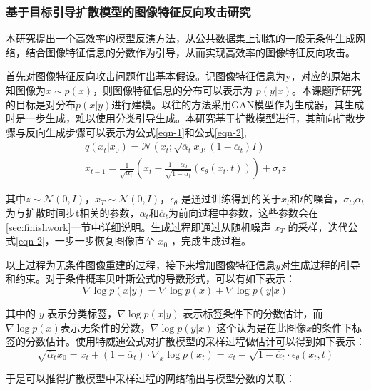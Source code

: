 \subsubsection{基于目标引导扩散模型的图像特征反向攻击研究}\label{sec:plan_1}
本研究提出一个高效率的模型反演方法，从公共数据集上训练的一般无条件生成网络，结合图像特征信息的分数作为引导，从而实现高效率的图像特征反向攻击。
\par
首先对图像特征反向攻击问题作出基本假设。记图像特征信息为y，对应的原始未知图像为$x \sim p(x)$，则图像特征信息的分布可以表示为 $p(y|x)$。本课题所研究的目标是对分布$p(x|y)$进行建模。以往的方法采用GAN模型作为生成器，其生成时是一步生成，难以使用分类引导生成。本研究基于扩散模型进行，其前向扩散步骤与反向生成步骤可以表示为公式\eqref{eqn-1}和公式\eqref{eqn-2},
\begin{align}
      q(x_t|x_{0})=\mathcal{N}(x_t;\sqrt{\overline{\alpha}_t}x_{0},(1-\overline{\alpha}_t)I)\label{eqn-1} \\
      x_{t-1}= \frac{1}{\sqrt{\alpha_t}}
      (x_t -
      \frac{1-\alpha_T}{\sqrt{1-\overline{\alpha}_t}}
      (\epsilon_\theta(x_t,t))) + \sigma_t z \label{eqn-2}
\end{align}
\par
其中$z \sim \mathcal{N}(0,I)$，$x_T \sim \mathcal{N}(0,I)$，$\epsilon_\theta$ 是通过训练得到的关于$x_t$和$t$的噪音，$\sigma_t$,$\alpha_t$ 为与扩散时间步t相关的参数，$\alpha_t$和$\overline{\alpha}_t$为前向过程中参数，这些参数会在\ref{sec:finishwork}一节中详细说明。生成过程即通过从随机噪声 $x_T$ 的采样，迭代公式\eqref{eqn-2}，一步一步恢复图像直至 $x_0$ ，完成生成过程。
\par
以上过程为无条件图像重建的过程，接下来增加图像特征信息$y$对生成过程的引导和约束。对于条件概率贝叶斯公式的导数形式，可以有如下表示：
\begin{equation}\label{eqn-3}
      \nabla \log p(x|y) = \nabla \log p(x) + \nabla \log p(y|x)
\end{equation}
\par
其中的 $y$ 表示分类标签，$\nabla \log p(x|y)$ 表示标签条件下的分数估计，而 $\nabla \log p(x)$表示无条件的分数，$\nabla \log p(y|x)$ 这个认为是在此图像$x$的条件下标签的分数估计。使用特威迪公式对扩散模型的采样过程做估计可以得到如下表示：
\begin{equation}\label{eqn-4}
      \sqrt{\overline{\alpha}_t}x_0 = x_t + (1 - \overline{\alpha}_t) \cdot \nabla_x \log p(x_t) = x_t - \sqrt{1-\overline{\alpha}_t}\cdot\epsilon_\theta(x_t,t)
\end{equation}
\par
于是可以推得扩散模型中采样过程的网络输出与模型分数的关联：
